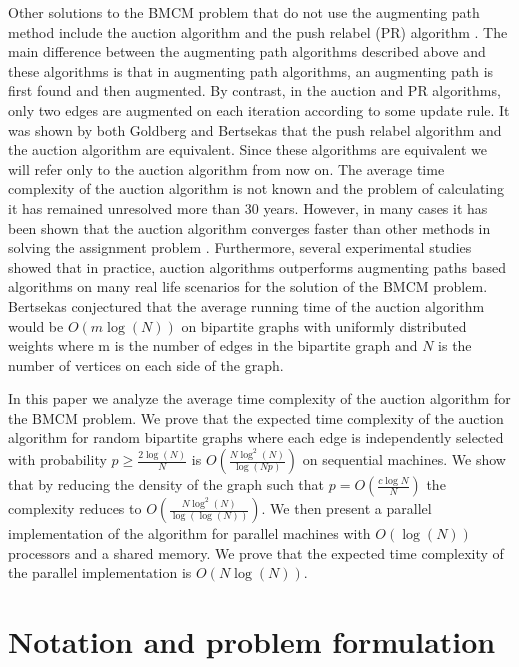 \documentclass[11pt,onecolumn]{article}
\begin{document}
 Other solutions to the BMCM problem that do not use the augmenting path method include the auction algorithm \cite{bertsekas1979distributed} and the push relabel (PR) algorithm \cite{goldberg1988new}. The main difference between the augmenting path algorithms described above and these algorithms is that in augmenting path algorithms, an augmenting path is first found and then augmented. By contrast, in the auction and PR algorithms, only two edges are augmented on each iteration according to some update rule. It was shown by both Goldberg \cite{goldberg1995efficient} and Bertsekas \cite{bertsekas1992forward} that the push relabel algorithm and the auction algorithm are equivalent. Since these algorithms are equivalent we will refer only to the auction algorithm from now on.
 The average time complexity of the auction algorithm is not known and the problem of calculating it has remained unresolved  more than $30$ years. However, in many cases it has been shown that the auction algorithm converges faster than other methods in solving the assignment problem \cite{bertsekas1990auction}. Furthermore, several experimental studies \cite{setubal1993new,setubal1996sequential,cherkassky1998augment,kaya2012push} showed that in practice, auction algorithms outperforms augmenting paths based algorithms on many real life scenarios for the solution of the BMCM problem. Bertsekas \cite{bertsekas1991reverse} conjectured that the average running time of the auction algorithm would be $O\left(m\log(N)\right)$ on bipartite graphs with uniformly distributed weights where m is the number of edges in the bipartite graph and $N$ is the number of vertices on each side of the graph.

In this paper we analyze the average time complexity of the auction algorithm for the BMCM problem.
We prove that the expected time complexity of the auction algorithm for random bipartite graphs where each edge is independently selected with probability $p\geq \frac{2\log(N)}{N}$ is $O\left(\frac{N\log^2(N)}{\log\left(Np\right)}\right)$  on sequential machines. We show that by reducing the density of the graph such that $p=O\left(\frac{c\log{N}}{N}\right)$ the complexity reduces to $O\left(\frac{N\log^2(N)}{\log\left(\log(N)\right)}\right)$. We then present a parallel implementation of the algorithm for parallel machines with $O\left(\log(N)\right)$ processors and a shared memory. We prove that the expected time complexity of the parallel implementation is $O(N\log(N))$.

\section {Notation and problem formulation}
\end{document}
